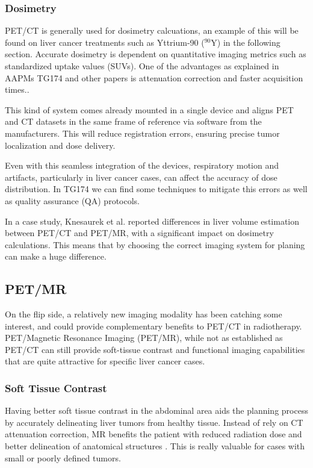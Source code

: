 \documentclass[11pt]{article} %
\begin{document}
\begin{multicols}{2}
\subsubsection{Dosimetry}
PET/CT is generally used for dosimetry calcuations, an example of this will be found on liver cancer treatments such as Yttrium-90 (\(^{90}\text{Y}\)) in the following section. Accurate dosimetry is dependent on quantitative imaging metrics such as standardized uptake values (SUVs). One of the advantages as explained in AAPMs TG174 and other papers is attenuation correction and faster acquisition times.\cite{knesaurek2018,TG174}. 

This kind of system %
comes already mounted in a single device and aligns PET and CT datasets in the same frame of reference via software from the manufacturers.\cite{TG174} This will reduce registration errors, ensuring precise tumor localization and dose delivery. 

Even with this seamless integration of the devices, respiratory motion and artifacts, particularly in liver cancer cases, can affect the accuracy of dose distribution. In TG174 we can find some techniques to mitigate this errors as well as quality assurance (QA) protocols. %

In a case study, Knesaurek et al. \cite{knesaurek2018} reported differences in liver volume estimation between PET/CT and PET/MR, with a significant impact on dosimetry calculations. This means that by choosing the correct imaging system for planing can make a huge difference. %


\subsection{PET/MR}
On the flip side, a relatively new imaging modality has been catching some interest, and could provide complementary benefits to PET/CT in radiotherapy. PET/Magnetic Resonance Imaging (PET/MR), while not as established as PET/CT can still provide soft-tissue contrast and functional imaging capabilities that are quite attractive for specific liver cancer cases. 

\subsubsection{Soft Tissue Contrast}
Having better soft tissue contrast in the abdominal area aids the planning process by accurately delineating liver tumors from healthy tissue. Instead of rely on CT attenuation correction, MR benefits the patient with reduced radiation dose and better delineation of anatomical structures \cite{knesaurek2018}. This is really valuable for cases with small or poorly defined tumors.


\end{multicols}
\end{document}
